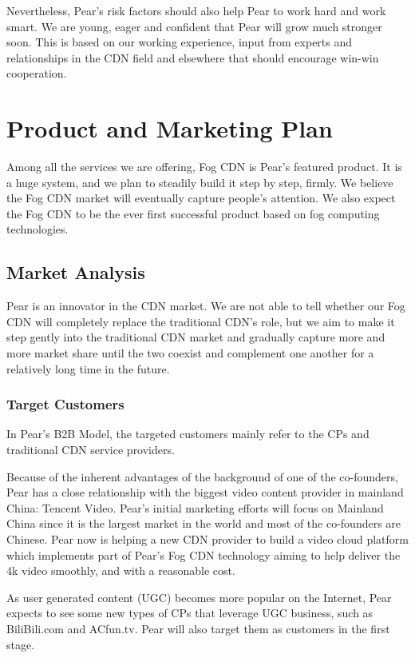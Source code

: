 Nevertheless, Pear's risk factors should also help Pear to work hard and work smart. We are young, eager and confident that Pear will grow much stronger soon. 
This is based on our working experience, input from experts and relationships in the CDN field and elsewhere that should encourage win-win cooperation.

\section{Product and Marketing Plan}
Among all the services we are offering, Fog CDN is Pear's featured product. It is a huge system, and we plan to steadily build it step by step, firmly. We believe the Fog CDN market will eventually capture people's attention. We also expect the Fog CDN to be the ever first successful product based on fog computing technologies. 

\subsection{Market Analysis}
Pear is an innovator in the CDN market. We are not able to tell whether our Fog CDN will completely replace the traditional CDN's role, but we aim to make it step gently into the traditional CDN market and gradually capture more and more market share until the two coexist and complement one another for a relatively long time in the future. 

\subsubsection{Target Customers}
In Pear's B2B Model, the targeted customers mainly refer to the CPs and traditional CDN service providers. 

Because of the inherent advantages of the background of one of the co-founders, Pear has a close relationship with the biggest video content provider in mainland China: Tencent Video. Pear's initial marketing efforts will focus on Mainland China since it is the largest market in the world and most of the co-founders are Chinese. 
Pear now is helping a new CDN provider to build a video cloud platform which implements part of Pear's Fog CDN technology aiming to help deliver the 4k video smoothly, and with a reasonable cost.

As user generated content (UGC) becomes more popular on the Internet, Pear expects to see some new types of CPs that leverage UGC business, such as BiliBili.com and ACfun.tv. Pear will also target them as customers in the first stage.

